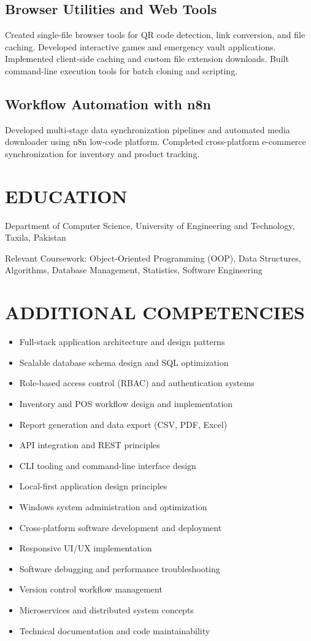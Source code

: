 \documentclass[11pt,letterpaper]{article}
\begin{document}
\subsection*{Browser Utilities and Web Tools}
Created single-file browser tools for QR code detection, link conversion, and file caching. Developed interactive games and emergency vault applications. Implemented client-side caching and custom file extension downloads. Built command-line execution tools for batch cloning and scripting.

\subsection*{Workflow Automation with n8n}
Developed multi-stage data synchronization pipelines and automated media downloader using n8n low-code platform. Completed cross-platform e-commerce synchronization for inventory and product tracking.

\section*{EDUCATION}

Department of Computer Science, University of Engineering and Technology, Taxila, Pakistan

Relevant Coursework: Object-Oriented Programming (OOP), Data Structures, Algorithms, Database Management, Statistics, Software Engineering

\section*{ADDITIONAL COMPETENCIES}

\begin{itemize}
  \item Full-stack application architecture and design patterns
  \item Scalable database schema design and SQL optimization
  \item Role-based access control (RBAC) and authentication systems
  \item Inventory and POS workflow design and implementation
  \item Report generation and data export (CSV, PDF, Excel)
  \item API integration and REST principles
  \item CLI tooling and command-line interface design
  \item Local-first application design principles
  \item Windows system administration and optimization
  \item Cross-platform software development and deployment
  \item Responsive UI/UX implementation
  \item Software debugging and performance troubleshooting
  \item Version control workflow management
  \item Microservices and distributed system concepts
  \item Technical documentation and code maintainability
\end{itemize}
\end{document}

